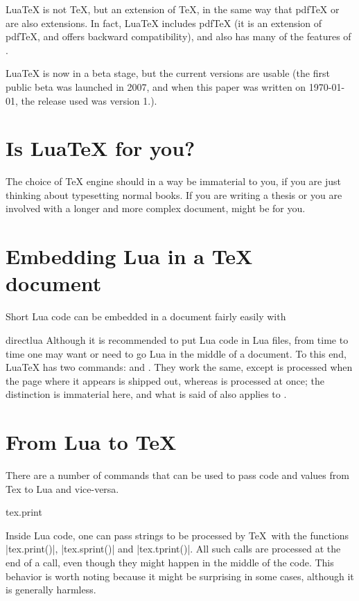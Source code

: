 Lua\TeX{} is not \TeX{}, but an extension of \TeX{}, in the same way that pdf\TeX{} or \XeTeX{} are also extensions.
In fact, Lua\TeX{} includes pdf\TeX{} (it is an extension of pdf\TeX{}, and offers backward compatibility), 
and also has many of the features of \XeTeX.

Lua\TeX{} is now in a beta stage, but the current versions are usable (the first public beta was launched in 2007,
and when this paper was written on \today, the release used was version 1.\the\luatexversion). 

\section{Is LuaTeX for you?}

The choice of TeX engine should in a way be immaterial to you, if you are just thinking about typesetting normal books. If you are writing a thesis or you are involved with a longer and more complex document, \lualatex might be for you. 

\section{Embedding Lua in a TeX document}

Short Lua code can be embedded in a document fairly easily with 
\begin{docCommand}{directlua}{}
Although it is recommended to put Lua code in Lua files, from time to time one may want or need to go Lua in the middle of a document. To this end, LuaTeX has two commands: \cmd{\directlua} and \cmd{\latelua}. They work the same, except \cmd{\latelua} is processed when the page where it appears is shipped out, whereas \cmd{\directlua} is processed at once; the distinction is immaterial here, and what is said of \cmd{\directlua} also applies to \cmd{\latelua}.
\end{docCommand}

\section{From Lua to TeX}

There are a number of commands that can be used to pass code and values from Tex to Lua and vice-versa.

\begin{docCommand}{tex.print}{}
\end{docCommand}

Inside Lua code, one can pass strings to be processed by \TeX\ with the functions |tex.print()|, |tex.sprint()| and |tex.tprint()|. All such calls are processed at the end of a  call, even though they might happen in the middle of the code. This behavior is worth noting because it might be surprising in some cases, although it is generally harmless.

